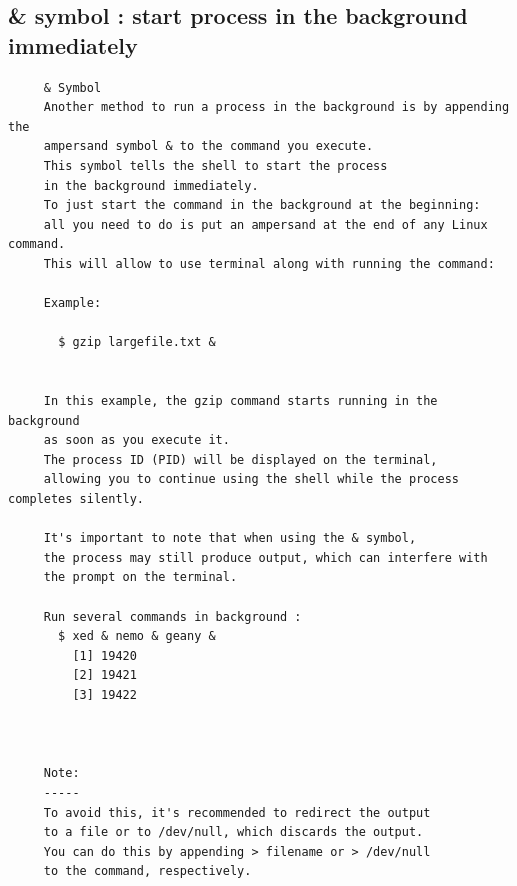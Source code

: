 \documentclass[a4paper,12pt]{article}
\begin{document}
\subsection{\& symbol   : start process in the background immediately  }
\begin{verbatim}
     & Symbol
     Another method to run a process in the background is by appending the
     ampersand symbol & to the command you execute. 
     This symbol tells the shell to start the process
     in the background immediately. 
     To just start the command in the background at the beginning: 
     all you need to do is put an ampersand at the end of any Linux command.
     This will allow to use terminal along with running the command:

     Example:

       $ gzip largefile.txt &
      
     
     In this example, the gzip command starts running in the background 
     as soon as you execute it. 
     The process ID (PID) will be displayed on the terminal, 
     allowing you to continue using the shell while the process completes silently.

     It's important to note that when using the & symbol, 
     the process may still produce output, which can interfere with
     the prompt on the terminal. 
     
     Run several commands in background : 
﻿       $ xed & nemo & geany &
         [1] 19420
         [2] 19421
         [3] 19422
     
     
     
     Note: 
     -----
     To avoid this, it's recommended to redirect the output
     to a file or to /dev/null, which discards the output. 
     You can do this by appending > filename or > /dev/null
     to the command, respectively.
     
     
\end{verbatim}
\end{document}
